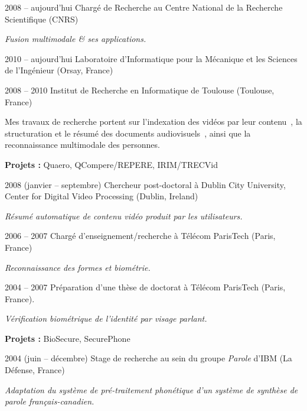 \documentclass{simplecv}
\begin{document}
\begin{topic}
\item[2008 -- aujourd'hui] Charg\'{e} de Recherche au Centre National de la Recherche Scientifique (CNRS)

\emph{Fusion multimodale \& ses applications.} 

\begin{topic}
	\item[2010 -- aujourd'hui] Laboratoire d'Informatique pour la M\'{e}canique et les Sciences de l'Ing\'{e}nieur (Orsay, France)
	\item[2008 -- 2010] Institut de Recherche en Informatique de Toulouse (Toulouse, France)
\end{topic}

Mes travaux de recherche portent sur l'indexation des vid\'{e}os par leur contenu~\cite{Bredin2012a}, la structuration et le r\'{e}sum\'{e} des documents audiovisuels~\cite{Bredin2012}, ainsi que la reconnaissance multimodale des personnes.

\textbf{Projets :} Quaero, QCompere/REPERE, IRIM/TRECVid

\item[2008 (janvier -- septembre)] Chercheur post-doctoral \`{a} Dublin City University,\\ Center for Digital Video Processing (Dublin, Ireland)

\emph{R\'{e}sum\'{e} automatique de contenu vid\'{e}o produit par les utilisateurs.}

\item[2006 -- 2007] Charg\'{e} d'enseignement/recherche \`{a} T\'{e}l\'{e}com ParisTech (Paris, France)

\emph{Reconnaissance des formes et biom\'{e}trie.}

\item[2004 -- 2007] Pr\'{e}paration d'une th\`{e}se de doctorat \`{a} T\'{e}l\'{e}com ParisTech (Paris, France).

\emph{V\'{e}rification biom\'{e}trique de l'identit\'{e} par visage parlant.}

\textbf{Projets :} BioSecure, SecurePhone 

\item[2004 (juin -- d\'{e}cembre)] Stage de recherche au sein du groupe \emph{Parole} d'IBM (La D\'{e}fense, France)

\emph{Adaptation du syst\`{e}me de pr\'{e}-traitement phon\'{e}tique d'un syst\`{e}me de synth\`{e}se de parole fran\c{c}ais-canadien.}
\end{topic}
\end{document}
